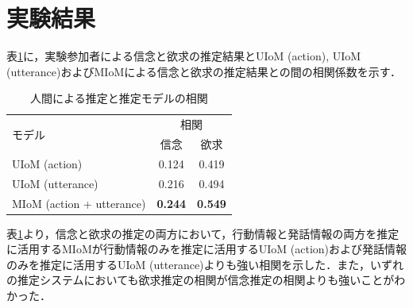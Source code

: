 \section{実験結果}

\par
表\ref{tab:cof}に，実験参加者による信念と欲求の推定結果とUIoM (action), UIoM (utterance)およびMIoMによる信念と欲求の推定結果との間の相関係数を示す．

\begin{table}[htb]
  \begin{center}
  \caption{人間による推定と推定モデルの相関}
  \label{tab:cof}
  \begin{tabular}{lcc} \hline
    \multirow{2}{*}{モデル}&\multicolumn{2}{c}{相関}\\\cline{2-3}
    & \hspace{10pt} 信念 \hspace{10pt} & \hspace{10pt} 欲求 \hspace{10pt} \\ \hline
    UIoM (action)&0.124&0.419\\
    UIoM (utterance)&0.216&0.494\\
    MIoM (action + utterance)&\bf0.244&\bf0.549 \\\hline
  \end{tabular}
\end{center}
\end{table}


\par
表\ref{tab:cof}より，信念と欲求の推定の両方において，行動情報と発話情報の両方を推定に活用するMIoMが行動情報のみを推定に活用するUIoM (action)および発話情報のみを推定に活用するUIoM (utterance)よりも強い相関を示した．また，いずれの推定システムにおいても欲求推定の相関が信念推定の相関よりも強いことがわかった．
